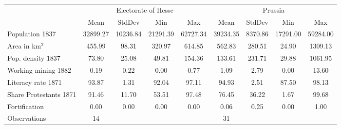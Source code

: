 {
\def\sym#1{\ifmmode^{#1}\else\(^{#1}\)\fi}
\begin{tabular}{l*{2}{cccc}}
\toprule
                    &\multicolumn{4}{c}{Electorate of Hesse}            &\multicolumn{4}{c}{Prussia}                        \\
                    &        Mean&      StdDev&         Min&         Max&        Mean&      StdDev&         Min&         Max\\
\midrule
Population 1837     &    32899.27&    10236.84&    21291.39&    62727.34&    39234.35&     8370.86&    17291.00&    59284.00\\
\addlinespace
Area in km$^2$      &      455.99&       98.31&      320.97&      614.85&      562.83&      280.51&       24.90&     1309.13\\
\addlinespace
Pop. density 1837   &       73.80&       25.08&       49.81&      154.36&      133.61&      231.71&       29.88&     1061.95\\
\addlinespace
Working mining 1882 &        0.19&        0.22&        0.00&        0.77&        1.09&        2.79&        0.00&       13.60\\
\addlinespace
Literacy rate 1871  &       93.87&        1.31&       92.04&       97.11&       94.93&        2.51&       87.50&       98.13\\
\addlinespace
Share Protestants 1871&       91.46&       11.70&       53.51&       97.48&       76.45&       36.22&        1.67&       99.68\\
\addlinespace
Fortification       &        0.00&        0.00&        0.00&        0.00&        0.06&        0.25&        0.00&        1.00\\
\midrule
Observations        &          14&            &            &            &          31&            &            &            \\
\bottomrule
\end{tabular}
}
